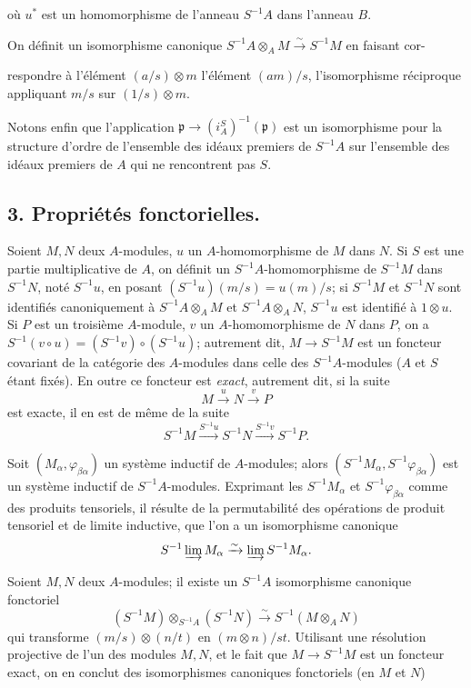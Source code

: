 où $u^*$ est un homomorphisme de l'anneau $S^{-1}A$ dans l'anneau $B$.

On définit un isomorphisme canonique $S^{-1}A \otimes_A M \xrightarrow{\sim} S^{-1}M$ en faisant cor-


\noindent
respondre à l'élément $(a/s) \otimes m$ l'élément $(am)/s$, l'isomorphisme réciproque appliquant $m/s$ sur $(1/s) \otimes m$.

Notons enfin que l'application $\mathfrak{p} \to (i_A^S)^{-1}(\mathfrak{p})$ est un isomorphisme pour la structure d'ordre de l'ensemble des idéaux premiers de $S^{-1}A$ sur l'ensemble des idéaux premiers de $A$ qui ne rencontrent pas $S$.

\subsection*{3. Propriétés fonctorielles.}

Soient $M, N$ deux $A$-modules, $u$ un $A$-homomorphisme de $M$ dans $N$. Si $S$ est une partie multiplicative de $A$, on définit un $S^{-1}A$-homomorphisme de $S^{-1}M$ dans $S^{-1}N$, noté $S^{-1}u$, en posant $(S^{-1}u)(m/s) = u(m)/s$; si $S^{-1}M$ et $S^{-1}N$ sont identifiés canoniquement à $S^{-1}A \otimes_A M$ et $S^{-1}A \otimes_A N$, $S^{-1}u$ est identifié à $1 \otimes u$. Si $P$ est un troisième $A$-module, $v$ un $A$-homomorphisme de $N$ dans $P$, on a $S^{-1}(v \circ u) = (S^{-1}v) \circ (S^{-1}u)$; autrement dit, $M \to S^{-1}M$ est un foncteur covariant de la catégorie des $A$-modules dans celle des $S^{-1}A$-modules ($A$ et $S$ étant fixés). En outre ce foncteur est \emph{exact}, autrement dit, si la suite
$$ M \xrightarrow{u} N \xrightarrow{v} P $$
est exacte, il en est de même de la suite
$$ S^{-1}M \xrightarrow{S^{-1}u} S^{-1}N \xrightarrow{S^{-1}v} S^{-1}P. $$

Soit $(M_\alpha, \varphi_{\beta\alpha})$ un système inductif de $A$-modules; alors $(S^{-1}M_\alpha, S^{-1}\varphi_{\beta\alpha})$ est un système inductif de $S^{-1}A$-modules. Exprimant les $S^{-1}M_\alpha$ et $S^{-1}\varphi_{\beta\alpha}$ comme des produits tensoriels, il résulte de la permutabilité des opérations de produit tensoriel et de limite inductive, que l'on a un isomorphisme canonique
$$ S^{-1} \varinjlim M_\alpha \xrightarrow{\sim} \varinjlim S^{-1}M_\alpha. $$

Soient $M, N$ deux $A$-modules; il existe un $S^{-1}A$ isomorphisme canonique fonctoriel
$$ (S^{-1}M) \otimes_{S^{-1}A} (S^{-1}N) \xrightarrow{\sim} S^{-1}(M \otimes_A N) $$
qui transforme $(m/s) \otimes (n/t)$ en $(m \otimes n)/st$. Utilisant une résolution projective de l'un des modules $M, N$, et le fait que $M \to S^{-1}M$ est un foncteur exact, on en conclut des isomorphismes canoniques fonctoriels (en $M$ et $N$)


